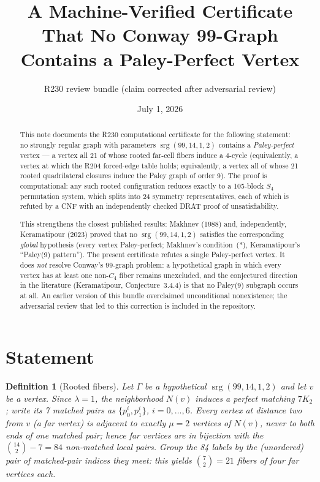 \documentclass[11pt]{article}
\title{A Machine-Verified Certificate That No Conway 99-Graph\\Contains a Paley-Perfect Vertex}
\author{R230 review bundle (claim corrected after adversarial review)}
\date{July 1, 2026}
\newtheorem{definition}{Definition}
\begin{document}
\maketitle

\begin{abstract}
This note documents the R230 computational certificate for the following
statement: no strongly regular graph with parameters
\(\operatorname{srg}(99,14,1,2)\) contains a \emph{Paley-perfect} vertex ---
a vertex all 21 of whose rooted far-cell fibers induce a 4-cycle
(equivalently, a vertex at which the R204 forced-edge table holds; equivalently,
a vertex all of whose 21 rooted quadrilateral closures induce the Paley graph of
order 9).  The proof is computational: any such rooted configuration reduces
exactly to a 105-block \(S_4\) permutation system, which splits into 24
symmetry representatives, each of which is refuted by a CNF with an
independently checked DRAT proof of unsatisfiability.

This strengthens the closest published results: Makhnev (1988) and, independently,
Keramatipour (2023) proved that no \(\operatorname{srg}(99,14,1,2)\) satisfies
the corresponding \emph{global} hypothesis (every vertex Paley-perfect;
Makhnev's condition~(*), Keramatipour's ``Paley(9) pattern'').  The present
certificate refutes a single Paley-perfect vertex.  It does \emph{not} resolve
Conway's 99-graph problem: a hypothetical graph in which every vertex has at
least one non-\(C_4\) fiber remains unexcluded, and the conjectured direction
in the literature (Keramatipour, Conjecture~3.4.4) is that no Paley(9) subgraph
occurs at all.  An earlier version of this bundle overclaimed unconditional
nonexistence; the adversarial review that led to this correction is included in
the repository.
\end{abstract}

\section{Statement}

\begin{definition}[Rooted fibers]
Let \(\Gamma\) be a hypothetical \(\operatorname{srg}(99,14,1,2)\) and let
\(v\) be a vertex.  Since \(\lambda=1\), the neighborhood \(N(v)\) induces a
perfect matching \(7K_2\); write its 7 matched pairs as
\(\{p_0^i,p_1^i\}\), \(i=0,\dots,6\).  Every vertex at distance two from
\(v\) (a \emph{far} vertex) is adjacent to exactly \(\mu=2\) vertices of
\(N(v)\), never to both ends of one matched pair; hence far vertices are in
bijection with the \(\binom{14}{2}-7=84\) non-matched local pairs.  Group the
84 labels by the (unordered) pair of matched-pair indices they meet: this
yields \(\binom{7}{2}=21\) \emph{fibers} of four far vertices each.
\end{definition}
\end{document}
